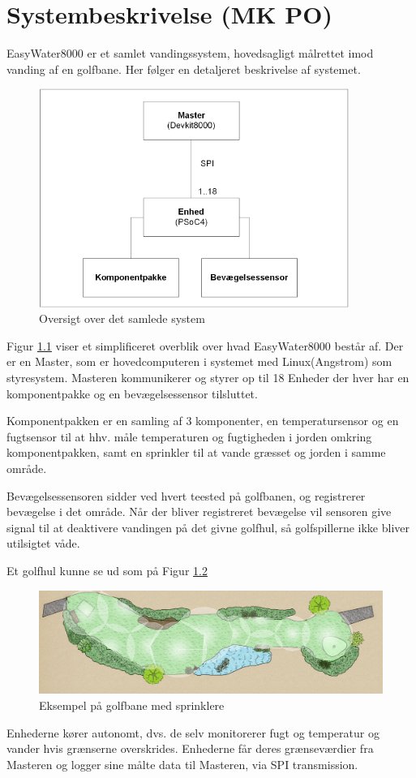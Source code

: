 \chapter{Systembeskrivelse (MK PO)}

EasyWater8000 er et samlet vandingssystem, hovedsagligt målrettet imod vanding af en golfbane. Her følger en detaljeret beskrivelse af systemet.

\begin{figure}[H]
  \centering
    \includegraphics[width=0.9\textwidth]{billeder/systembeskrivelse}
    \caption{Oversigt over det samlede system}
    \label{fig:systembeskrivelse}
\end{figure}

Figur \ref{fig:systembeskrivelse} viser et simplificeret overblik over hvad EasyWater8000 består af. Der er en Master, som er hovedcomputeren i systemet med Linux(Angstrom) som styresystem. Masteren kommunikerer og styrer op til 18 Enheder der hver har en komponentpakke og en bevægelsessensor tilsluttet.

Komponentpakken er en samling af 3 komponenter, en temperatursensor og en fugtsensor til at hhv. måle temperaturen og fugtigheden i jorden omkring komponentpakken, samt en sprinkler til at vande græsset og jorden i samme område.

Bevægelsessensoren sidder ved hvert teested på golfbanen, og registrerer bevægelse i det område. Når der bliver registreret bevægelse vil sensoren give signal til at deaktivere vandingen på det givne golfhul, så golfspillerne ikke bliver utilsigtet våde.

Et golfhul kunne se ud som på Figur \ref{fig:hul_med_sprinkler}

\begin{figure}[H]
  \centering
    \includegraphics[width=\textwidth]{billeder/hul_med_sprinkler}
    \caption{Eksempel på golfbane med sprinklere}
    \label{fig:hul_med_sprinkler}
\end{figure}

Enhederne kører autonomt, dvs. de selv monitorerer fugt og temperatur og vander hvis grænserne overskrides. Enhederne får deres grænseværdier fra Masteren og logger sine målte data til Masteren, via SPI transmission.